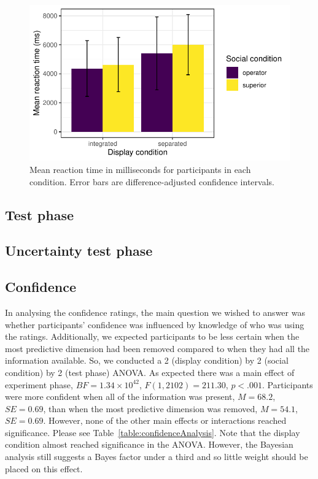 \documentclass[doc, a4paper, apacite]{apa6}
\begin{document}
\begin{figure}
	\centering
	\includegraphics{images/DSTL07learningRT}
	\caption{Mean reaction time in milliseconds for participants in each condition. Error bars are difference-adjusted confidence intervals.}
	\label{fig:DSTL07learningRT}
\end{figure}

\subsection{Test phase}



\subsection{Uncertainty test phase}


\subsection{Confidence}
In analysing the confidence ratings, the main question we wished to answer was whether participants' confidence was influenced by knowledge of who was using the ratings. 
Additionally, we expected participants to be less certain when the most predictive dimension had been removed compared to when they had all the information available. 
So, we conducted a 2 (display condition) by 2 (social condition) by 2 (test phase) ANOVA. 
As expected there was a main effect of experiment phase, $BF=1.34 \times 10^{42}$, $F(1, 2102)=211.30$, $p<.001$. 
Participants were more confident when all of the information was present, $M=68.2$, $SE=0.69$, than when the most predictive dimension was removed, $M=54.1$, $SE=0.69$. 
However, none of the other main effects or interactions reached significance. 
Please see Table~\ref{table:confidenceAnalysis}. 
Note that the display condition almost reached significance in the ANOVA. 
However, the Bayesian analysis still suggests a Bayes factor under a third and so little weight should be placed on this effect. 
\end{document}
